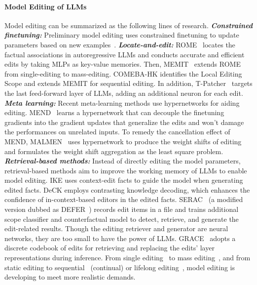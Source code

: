 \paragraph{Model Editing of LLMs} 
Model editing can be summarized as the following lines of research. 
\textbf{\textit{Constrained finetuning:}} Preliminary model editing uses constrained finetuning to update parameters based on new examples~\cite{constrained_ft_me_1,constrained_ft_me_2}. 
\textbf{\textit{Locate-and-edit:}} ROME~\cite{rome} locates the factual associations in autoregressive LLMs and conducts accurate and efficient edits by taking MLPs as key-value memories. 
Then, MEMIT~\cite{memit} extends ROME from single-editing to mass-editing.
COMEBA-HK \cite{comeba} identifies the Local Editing Scope and extends MEMIT for sequential editing.
In addition, T-Patcher~\cite{t-patcher} targets the last feed-forward layer of LLMs, adding an additional neuron for each edit. 
\textbf{\textit{Meta learning:}} Recent meta-learning methods use hypernetworks for aiding editing. MEND~\cite{mend} learns a hypernetwork that can decouple the finetuning gradients into the gradient updates that generalize the edits and won't damage the performances on unrelated inputs. To remedy the cancellation effect of MEND, MALMEN~\cite{malmen} uses hypernetwork to produce the weight shifts of editing and formulates the weight shift aggregation as the least square problem. 
\textbf{\textit{Retrieval-based methods:}} Instead of directly editing the model parameters, retrieval-based methods aim to improve the working memory of LLMs to enable model editing. IKE \cite{ike} uses context-edit facts to guide the model when generating edited facts. 
DeCK \cite{deck} employs contrasting knowledge decoding, which enhances the confidence of in-context-based editors in the edited facts. SERAC~\cite{serac} (a modified version dubbed as DEFER~\cite{grace}) records edit items in a file and trains additional scope classifier and counterfactual model to detect, retrieve, and generate the edit-related results. Though the editing retriever and generator are neural networks, they are too small to have the power of LLMs. GRACE~\cite{grace} adopts a discrete codebook of edits for retrieving and replacing the edits' layer representations during inference. From single editing~\cite{rome} to mass editing~\cite{malmen,memit}, and from static editing to sequential~\cite{t-patcher} (continual) or lifelong editing~\cite{grace}, model editing is developing to meet more realistic demands.

